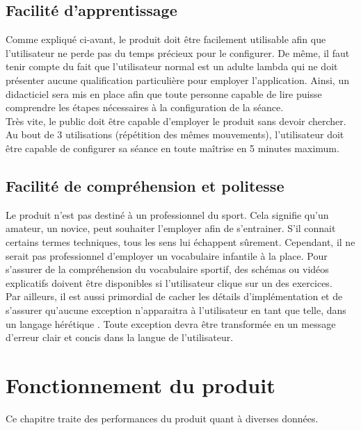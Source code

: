 \subsection*{Facilité d'apprentissage}
Comme expliqué ci-avant, le produit doit être facilement utilisable afin que l'utilisateur ne perde pas du temps précieux pour le configurer. De même, il faut tenir compte du fait que l'utilisateur normal est un adulte lambda qui ne doit présenter aucune qualification particulière pour employer l'application. Ainsi, un didacticiel sera mis en place afin que toute personne capable de lire puisse comprendre les étapes nécessaires à la configuration de la séance.\\

Très vite, le public doit être capable d'employer le produit sans devoir chercher. Au bout de 3 utilisations (répétition des mêmes mouvements), l'utilisateur doit être capable de configurer sa séance en toute maîtrise en 5 minutes maximum.

\subsection*{Facilité de compréhension et politesse}
Le produit n'est pas destiné à un professionnel du sport. Cela signifie qu'un amateur, un novice, peut souhaiter l'employer afin de s'entrainer. S'il connait certains termes techniques, tous les sens lui échappent sûrement. Cependant, il ne serait pas professionnel d'employer un vocabulaire infantile à la place. Pour s'assurer de la compréhension du vocabulaire sportif, des schémas ou vidéos explicatifs doivent être disponibles si l'utilisateur clique sur un des exercices.\\

Par ailleurs, il est aussi primordial de cacher les détails d'implémentation et de s'assurer qu'aucune exception n'apparaitra à l'utilisateur en tant que telle, dans un langage \og hérétique \fg{}. Toute exception devra être transformée en un message d'erreur clair et concis dans la langue de l'utilisateur.

\section{Fonctionnement du produit}
Ce chapitre traite des performances du produit quant à diverses données.



